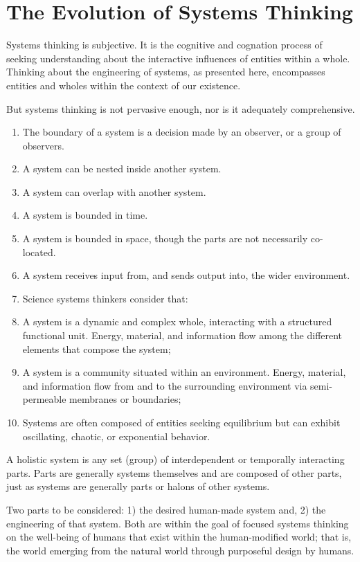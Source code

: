 
\section{The Evolution of Systems Thinking}

Systems thinking is subjective. It is the cognitive and cognation process of seeking understanding about the interactive influences of entities within a whole. Thinking about the engineering of systems, as presented here, encompasses entities and wholes within the context of our existence.

But systems thinking is not pervasive enough, nor is it adequately comprehensive. 

\begin{enumerate}
\item The boundary of a system is a decision made by an observer, or a group of observers.
\item A system can be nested inside another system.
\item A system can overlap with another system.
\item A system is bounded in time.
\item A system is bounded in space, though the parts are not necessarily co-located.
\item A system receives input from, and sends output into, the wider environment.
\item Science systems thinkers consider that:
\item A system is a dynamic and complex whole, interacting with a structured functional unit. Energy, material, and information flow among the different elements that compose the system;
\item A system is a community situated within an environment. Energy, material, and information flow from and to the surrounding environment via semi-permeable membranes or boundaries;
\item Systems are often composed of entities seeking equilibrium but can exhibit oscillating, chaotic, or exponential behavior.
\end{enumerate}

A holistic system is any set (group) of interdependent or temporally interacting parts. Parts are generally systems themselves and are composed of other parts, just as systems are generally parts or halons of other systems.

Two parts to be considered: 1) the desired human-made system and, 2) the engineering of that system. Both are within the goal of focused systems thinking on the well-being of humans that exist within the human-modified world; that is, the world emerging from the natural world through purposeful design by humans.

